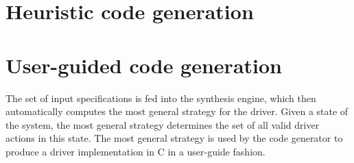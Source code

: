 \section{Heuristic code generation}

\section{User-guided code generation}
\label{s:user-guided}

The set of input \tsl specifications is fed into the \termite synthesis engine, which then automatically computes the most general strategy for the driver.  Given a state of the system, the most general strategy determines the set of all valid driver actions in this state.  The most general strategy is used by the \termite code generator to produce a driver implementation in C in a user-guide fashion.


